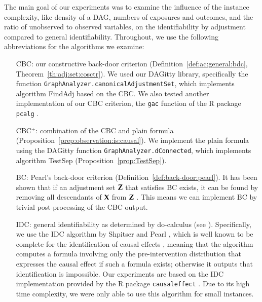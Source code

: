 The main goal of our experiments was to examine the influence of the instance complexity,
like density of a DAG, numbers of exposures and  outcomes, and the ratio of unobserved to observed variables, on the identifiability by adjustment compared to general identifiability. Throughout, we use the following abbreviations for the algorithms we examine:
\begin{itemize}%
\item[CBC:] our constructive back-door criterion (Definition~\ref{def:ac:general:bdc}, Theorem~\ref{th:adj:set:cosctr}). We used our DAGitty library, specifically the function 
   {\tt GraphAnalyzer.canonicalAdjustmentSet}, which implements algorithm {\sc FindAdj}  
   based on the CBC.
 We also tested another implementation of our CBC criterion, the {\tt gac} function of the R package {\tt pcalg} \cite{pcalg}. 
\item[CBC$^+$:] combination of the CBC and plain formula (Proposition~\ref{prep:observation:is:causal}). We implement the plain formula using the DAGitty  function {\tt GraphAnalyzer.dConnected}, 
   which implements algorithm {\sc TestSep} (Proposition~\ref{prop:TestSep}).
\item[BC:] Pearl's back-door criterion (Definition~\ref{def:back-door:pearl}). 
It has been shown that if an adjustment set ${\bf Z}$ that satisfies BC exists, it can be found 
by removing all descendants of ${\bf X}$ from ${\bf Z}$
\cite{PerkovicEtAl2018}. This means we can implement BC by trivial post-processing of the CBC output. 
\item[IDC:] general identifiability as determined by do-calculus (see \cite[Chapter 3.4.2]{Pearl2009}). 
Specifically, we use the IDC algorithm by Shpitser and Pearl \cite{ShpitserIDCAlgorithm}, which is well known to be complete for the identification of causal effects \cite{shpitser2006identification,huang2006pearl}, meaning that the algorithm computes a formula involving only the pre-intervention distribution that expresses the causal effect if such a formula exists; otherwise it outputs that identification is impossible.
Our experiments are based on the IDC implementation 
provided by the R package {\tt causaleffect} \cite{RpackageCausalEffect}.
Due to its high time complexity, we were only able to use this algorithm for small instances.


\end{itemize}%
%

